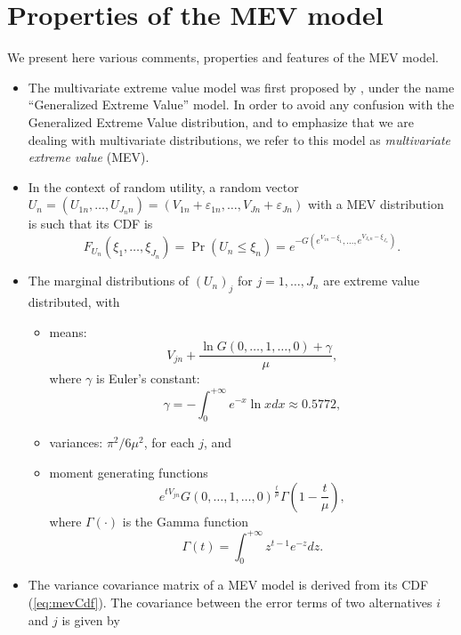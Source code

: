 \documentclass[12pt,a4paper]{article}
\newcommand{\req}[1]{(\ref{#1})}
\newcommand{\prob}{\operatorname{Pr}}
\begin{document}
\section{Properties of the MEV model}
\label{sec:MEVproperties}
We present here various comments, properties and features of the MEV model. 
\begin{itemize}
\item The multivariate extreme value model was first proposed by
, under the name ``Generalized Extreme Value''
model. In order to avoid any confusion with the Generalized Extreme
Value distribution, and to
emphasize that we are dealing with multivariate distributions, we
 refer to this model as \emph{multivariate extreme value} (MEV).
\item In the context of random utility, a random vector $U_n=(U_{1n},\ldots,U_{J_nn})=(V_{1n}+\varepsilon_{1n},\ldots,V_{Jn}+\varepsilon_{Jn})$ with  a MEV distribution is such that its CDF is
\begin{equation}
\label{eq:mevCdfU}
 F_{U_n}(\xi_{1},\ldots,\xi_{J_n}) = \prob(U_n \leq \xi_n) =
e^{-G(e^{V_{1n}-\xi_1},\ldots,e^{V_{J_nn}-\xi_{J_n}})}.
\end{equation}
\item The marginal distributions of $(U_n)_j$ for $j=1,\ldots,J_n$ are extreme value distributed, with 
\begin{itemize}
\item means:
\begin{equation}
\label{eq:meanMarginals}
V_{jn} + \frac{\ln G(0,\ldots,1,\ldots,0) +\gamma}{\mu},
\end{equation}
where $\gamma$ is Euler's constant:
\begin{equation}
\label{eq:eulersConstant}
\gamma = - \int_0^{+\infty} e^{-x} \ln x dx \approx 0.5772,
\end{equation}
 \item  variances: $\pi^2/6 \mu^2$, for each $j$, and
\item  moment generating functions
\begin{equation}
e^{tV_{jn}} G(0,\ldots,1,\ldots,0)^{\frac{t}{\mu}} \Gamma\left(1-\frac{t}{\mu}\right),
\end{equation}
where $\Gamma(\cdot)$ is the Gamma function
\[
\Gamma(t) = \int_0^{+\infty}z^{t-1}e^{-z}dz.
\]
\end{itemize}
\item The variance covariance matrix of a MEV model is derived from its CDF \req{eq:mevCdf}.
The covariance between the error terms of two alternatives $i$ and $j$ is given by

\end{itemize}
\end{document}
